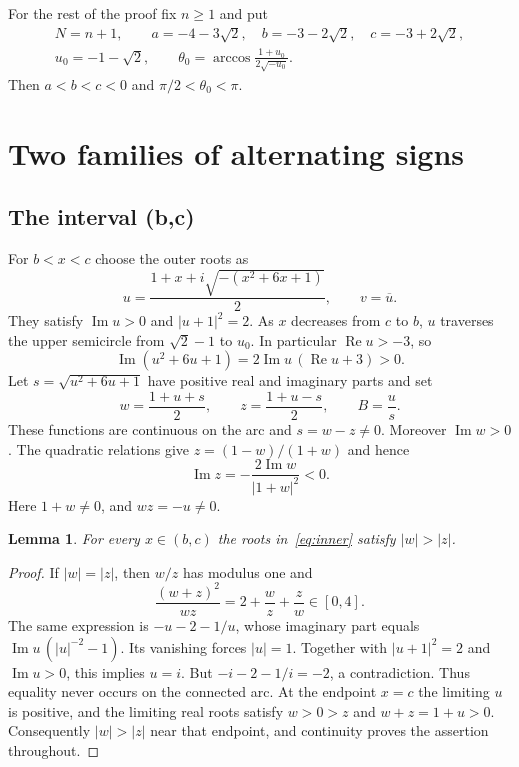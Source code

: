 \documentclass[11pt]{article}
\newtheorem{lemma}{Lemma}
\begin{document}
For the rest of the proof fix $n\geq1$ and put
\begin{equation}\label{eq:constants}
 \begin{gathered}
 N=n+1,\qquad a=-4-3\sqrt2,\quad b=-3-2\sqrt2,\quad c=-3+2\sqrt2,\\
 u_0=-1-\sqrt2,\qquad
 \theta_0=\arccos\frac{1+u_0}{2\sqrt{-u_0}}.
 \end{gathered}
\end{equation}
Then $a<b<c<0$ and $\pi/2<\theta_0<\pi$.

\section{Two families of alternating signs}

\subsection{The interval (b,c)}

For $b<x<c$ choose the outer roots as
\[
 u=\frac{1+x+i\sqrt{-(x^2+6x+1)}}2,\qquad v=\overline u.
\]
They satisfy $\operatorname{Im}u>0$ and $|u+1|^2=2$. As $x$ decreases
from $c$ to $b$, $u$ traverses the upper semicircle from $\sqrt2-1$ to
$u_0$. In particular $\operatorname{Re}u>-3$, so
\[
 \operatorname{Im}(u^2+6u+1)
 =2\operatorname{Im}u\,(\operatorname{Re}u+3)>0.
\]
Let $s=\sqrt{u^2+6u+1}$ have positive real and imaginary parts and set
\begin{equation}\label{eq:inner}
 w=\frac{1+u+s}2,\qquad z=\frac{1+u-s}2,\qquad B=\frac{u}{s}.
\end{equation}
These functions are continuous on the arc and $s=w-z\ne0$.
Moreover $\operatorname{Im}w>0$. The quadratic relations give
$z=(1-w)/(1+w)$ and hence
\[
 \operatorname{Im}z=-\frac{2\operatorname{Im}w}{|1+w|^2}<0.
\]
Here $1+w\ne0$, and $wz=-u\ne0$.

\begin{lemma}\label{lem:dominance}
For every $x\in(b,c)$ the roots in~\eqref{eq:inner} satisfy $|w|>|z|$.
\end{lemma}
\begin{proof}
If $|w|=|z|$, then $w/z$ has modulus one and
\[
 \frac{(w+z)^2}{wz}=2+\frac wz+\frac zw\in[0,4].
\]
The same expression is $-u-2-1/u$, whose imaginary part equals
$\operatorname{Im}u\,(|u|^{-2}-1)$. Its vanishing forces $|u|=1$.
Together with $|u+1|^2=2$ and $\operatorname{Im}u>0$, this implies $u=i$.
But $-i-2-1/i=-2$, a contradiction. Thus equality never occurs on the
connected arc. At the endpoint $x=c$ the limiting $u$ is positive, and
the limiting real roots satisfy $w>0>z$ and $w+z=1+u>0$. Consequently
$|w|>|z|$ near that endpoint, and continuity proves the assertion throughout.
\end{proof}
\end{document}
